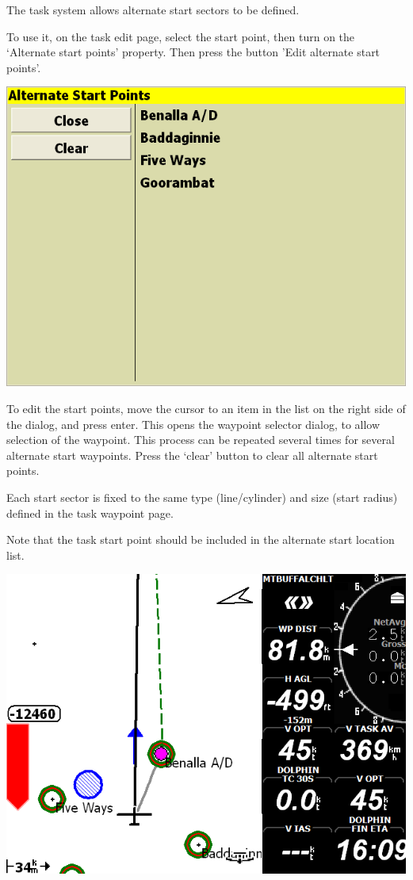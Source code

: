 \documentclass[a4paper,12pt]{refrep}
\begin{document}
The task system allows alternate start sectors to be defined.
  
To use it, on the task edit page, select the start point, then turn on
the `Alternate start points' property.  Then press the button 'Edit
alternate start points'.

\begin{center}
\includegraphics[angle=0,width=\linewidth,keepaspectratio='true']{figures/dialog-startpoint2.png}
\end{center}
  
  To edit the start points, move the cursor to an item in the list on
  the right side of the dialog, and press enter.  This opens the
  waypoint selector dialog, to allow selection of the waypoint.  This
  process can be repeated several times for several alternate start
  waypoints.  Press the `clear' button to clear all alternate start
  points.

  Each start sector is fixed to the same type (line/cylinder) and size
  (start radius) defined in the task waypoint page.

  Note that the task start point should be included in the alternate
  start location list. 

\begin{center}
\includegraphics[angle=0,width=\linewidth,keepaspectratio='true']{figures/dialog-startpoint3.png}
\end{center}
\end{document}
